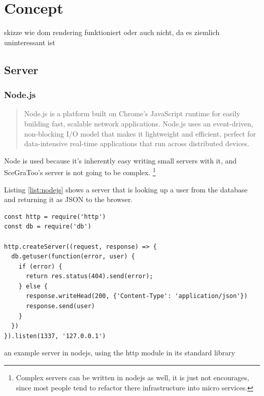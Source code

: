 
\section{Concept}
\label{concept}

skizze wie dom rendering funktioniert oder auch nicht, da es ziemlich
uninteressant ist

\subsection{Server}
\label{server}

\subsubsection{Node.js}
\begin{quote}
  Node.js is a platform built on Chrome's JavaScript runtime for easily building fast, scalable network applications. Node.js uses an event-driven, non-blocking I/O model that makes it lightweight and efficient, perfect for data-intensive real-time applications that run across distributed devices. \cite{nodejs}
\end{quote}

Node is used because it's inherently easy writing small servers with it, and
SceGraToo's server is not going to be complex. \footnote{Complex servers can be
written in nodejs as well, it is just not encourages, since most people tend to
refactor there infrastructure into micro services.}

Listing \ref{list:nodejs} shows a server that is looking up a user from the database and returning it as JSON to the browser.

\begin{listing}
  \begin{verbatim}
const http = require('http')
const db = require('db')

http.createServer((request, response) => {
  db.getuser(function(error, user) {
    if (error) {
      return res.status(404).send(error);
    } else {
      response.writeHead(200, {'Content-Type': 'application/json'})
      response.send(user)
    }
  })
}).listen(1337, '127.0.0.1')
  \end{verbatim}
  \caption{an example server in nodejs, using the http module in its standard library}
  \label{list:nodejs}
\end{listing}

